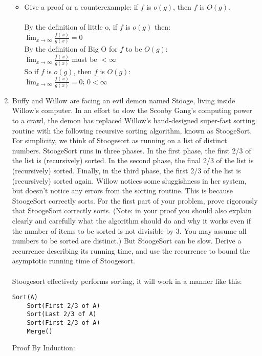 \documentclass[11pt]{article}
\begin{document}
\begin{enumerate}
\begin{itemize}
\item Give a proof or a counterexample: if $f$ is $o(g)$, then $f$ is $O(g)$.\\\\
By the definition of little o, if $f$ is $o(g)$ then:\\
$\lim_{x\to\infty}\frac{f(x)}{g(x)} = 0$\\
By the definition of Big O for $f$ to be $O(g)$:\\
$\lim_{x\to\infty}\frac{f(x)}{g(x)}$ must be $< \infty$\\
So if $f$ is $o(g)$, then $f$ is $O(g)$:\\
$\lim_{x\to\infty}\frac{f(x)}{g(x)} = 0$; $0 < \infty$

\end {itemize}

\item Buffy and Willow are facing an evil demon named Stooge, living inside Willow’s computer. In an
effort to slow the Scooby Gang’s computing power to a crawl, the demon has replaced Willow’s
hand-designed super-fast sorting routine with the following recursive sorting algorithm, known as
StoogeSort. For simplicity, we think of Stoogesort as running on a list of distinct numbers. StoogeSort
runs in three phases. In the first phase, the first 2/3 of the list is (recursively) sorted. In the second
phase, the final 2/3 of the list is (recursively) sorted. Finally, in the third phase, the first 2/3 of the
list is (recursively) sorted again.
Willow notices some sluggishness in her system, but doesn’t notice any errors from the sorting routine.
This is because StoogeSort correctly sorts. For the first part of your problem, prove rigorously that
StoogeSort correctly sorts. (Note: in your proof you should also explain clearly and carefully what
the algorithm should do and why it works even if the number of items to be sorted is not divisible
by 3. You may assume all numbers to be sorted are distinct.) But StoogeSort can be slow. Derive
a recurrence describing its running time, and use the recurrence to bound the asymptotic running
time of Stoogesort.\\\\
Stoogesort effectively performs sorting, it will work in a manner like this:\\
\begin{verbatim}
Sort(A)
    Sort(First 2/3 of A)
    Sort(Last 2/3 of A)
    Sort(First 2/3 of A)
    Merge()
\end{verbatim}
Proof By Induction:\\

\end{enumerate}
\end{document}
